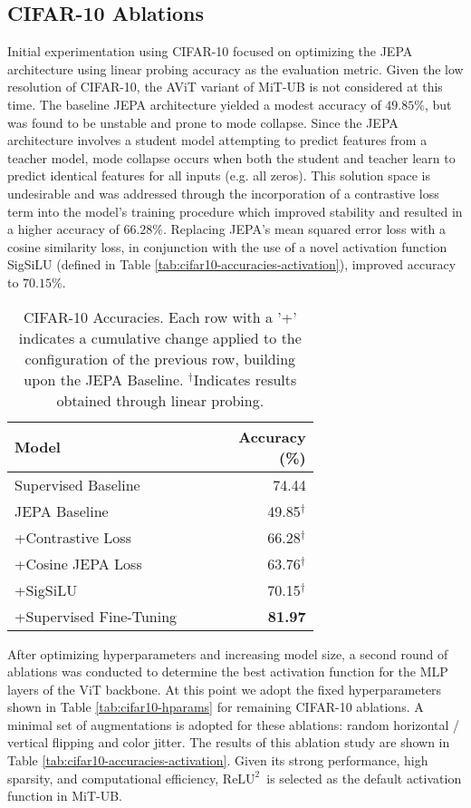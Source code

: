 \documentclass[12pt]{article}
\newcommand{\reluTwo}{$\text{ReLU}^2$}
\begin{document}
\subsection{CIFAR-10 Ablations}

Initial experimentation using CIFAR-10 focused on optimizing the JEPA architecture using linear probing accuracy as the evaluation metric.
Given the low resolution of CIFAR-10, the AViT variant of MiT-UB is not considered at this time.
The baseline JEPA architecture yielded a modest accuracy of $49.85\%$, but was found to be unstable and prone to mode collapse. Since
the JEPA architecture involves a student model attempting to predict features from a teacher model, mode collapse occurs when both the 
student and teacher learn to predict identical features for all inputs (e.g. all zeros). This solution space is undesirable and was addressed
through the incorporation of a contrastive loss term into the model's training procedure which improved stability and resulted in a higher 
accuracy of $66.28\%$. Replacing JEPA's mean squared error loss with a cosine similarity loss, in conjunction with the use of a novel activation function
SigSiLU (defined in Table \ref{tab:cifar10-accuracies-activation}), improved accuracy to $70.15\%$.

\begin{table}[H]
    \centering
    \begin{tabular}{p{0.67\linewidth}r}
        \toprule
        Model & Accuracy (\%) \\
        \midrule
        Supervised Baseline & 74.44 \\
        \midrule
        JEPA Baseline & 49.85$^{\dagger}$ \\
        +Contrastive Loss & 66.28$^{\dagger}$ \\
        +Cosine JEPA Loss & 63.76$^{\dagger}$ \\
        +SigSiLU & 70.15$^{\dagger}$ \\
        +Supervised Fine-Tuning & \textbf{81.97} \\
        \bottomrule
    \end{tabular}
    \caption{CIFAR-10 Accuracies. Each row with a '+' indicates a cumulative change applied to the configuration of the previous row, building upon the JEPA Baseline. $^\dagger$Indicates results obtained through linear probing.}
    \label{tab:cifar10-accuracies}
\end{table}

After optimizing hyperparameters and increasing model size, a second round of ablations was conducted to determine the best activation function for the MLP layers of the ViT backbone.
At this point we adopt the fixed hyperparameters shown in Table \ref{tab:cifar10-hparams} for remaining CIFAR-10 ablations. 
A minimal set of augmentations is adopted for these ablations: random horizontal / vertical flipping and color jitter. The results of this ablation study are shown 
in Table \ref{tab:cifar10-accuracies-activation}. Given its strong performance, high sparsity, and computational efficiency, \reluTwo\ is selected as the default activation function in MiT-UB.
\end{document}
